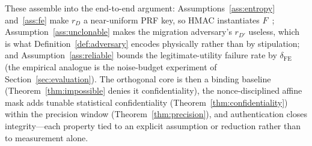 These assemble into the end-to-end argument: Assumptions~\ref{ass:entropy}
and~\ref{ass:fe} make $r_D$ a near-uniform PRF key, so HMAC instantiates
$F$~\cite{suh_devadas_puf,gassend_silicon}; Assumption~\ref{ass:unclonable} makes
the migration adversary's $r_{D'}$ useless, which is what
Definition~\ref{def:adversary} encodes physically rather than by stipulation; and
Assumption~\ref{ass:reliable} bounds the legitimate-utility failure rate by
$\delta_{\mathrm{FE}}$ (the empirical analogue is the noise-budget experiment of
Section~\ref{sec:evaluation}). The orthogonal core is then a binding baseline
(Theorem~\ref{thm:impossible} denies it confidentiality), the nonce-disciplined
affine mask adds tunable statistical confidentiality
(Theorem~\ref{thm:confidentiality}) within the precision window
(Theorem~\ref{thm:precision}), and authentication closes integrity---each property
tied to an explicit assumption or reduction rather than to measurement alone.
